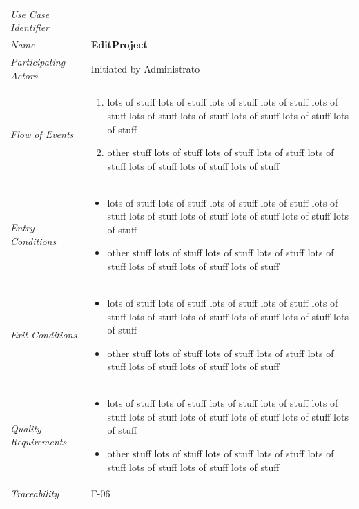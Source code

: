 \documentclass[12pt,letterpaper]{article}
\begin{document}
\begin{center}
	\begin{tabu} to 
		\toprule
		Use Case Identifier & \editproject{} \\
		Name & {\bf EditProject} \\
		Participating Actors & Initiated by Administrato \\
		Flow of Events & 
	    \begin{enumerate}[topsep=-1em]
		    \item lots of stuff lots of stuff lots of stuff lots of stuff lots of stuff lots of stuff lots of stuff lots of stuff lots of stuff lots of stuff
		    \item other stuff lots of stuff lots of stuff lots of stuff lots of stuff lots of stuff lots of stuff lots of stuff
		\end{enumerate} \\

		Entry Conditions &
		\begin{itemize}[topsep=-1em]
		    \item lots of stuff lots of stuff lots of stuff lots of stuff lots of stuff lots of stuff lots of stuff lots of stuff lots of stuff lots of stuff
		    \item other stuff lots of stuff lots of stuff lots of stuff lots of stuff lots of stuff lots of stuff lots of stuff
        \end{itemize} \\

		Exit Conditions &
		\begin{itemize}[topsep=-1em]
		    \item lots of stuff lots of stuff lots of stuff lots of stuff lots of stuff lots of stuff lots of stuff lots of stuff lots of stuff lots of stuff
		    \item other stuff lots of stuff lots of stuff lots of stuff lots of stuff lots of stuff lots of stuff lots of stuff
        \end{itemize} \\

		Quality Requirements &
		\begin{itemize}[topsep=-1em]
		    \item lots of stuff lots of stuff lots of stuff lots of stuff lots of stuff lots of stuff lots of stuff lots of stuff lots of stuff lots of stuff
		    \item other stuff lots of stuff lots of stuff lots of stuff lots of stuff lots of stuff lots of stuff lots of stuff
        \end{itemize} \\

		Traceability & F-06 \\
		\toprule
	\end{tabu}
\end{center}
\end{document}
